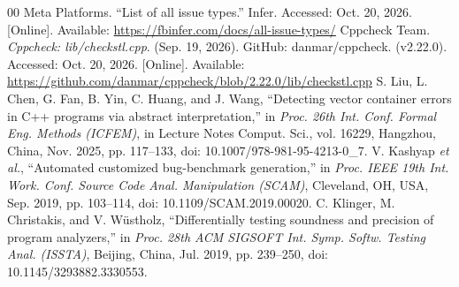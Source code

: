 \documentclass[conference]{IEEEtran}
\begin{document}
\begin{thebibliography}{00}
 Meta Platforms. ``List of all issue types.'' Infer. Accessed: Oct. 20, 2026. [Online]. Available: \url{https://fbinfer.com/docs/all-issue-types/}
 Cppcheck Team. \textit{Cppcheck: lib/checkstl.cpp}. (Sep. 19, 2026). GitHub: danmar/cppcheck. (v2.22.0). Accessed: Oct. 20, 2026. [Online]. Available: \url{https://github.com/danmar/cppcheck/blob/2.22.0/lib/checkstl.cpp}
 S. Liu, L. Chen, G. Fan, B. Yin, C. Huang, and J. Wang, ``Detecting vector container errors in C++ programs via abstract interpretation,'' in \textit{Proc. 26th Int. Conf. Formal Eng. Methods (ICFEM)}, in Lecture Notes Comput. Sci., vol. 16229, Hangzhou, China, Nov. 2025, pp. 117--133, doi: 10.1007/978-981-95-4213-0\_7.
 V. Kashyap \textit{et al.}, ``Automated customized bug-benchmark generation,'' in \textit{Proc. IEEE 19th Int. Work. Conf. Source Code Anal. Manipulation (SCAM)}, Cleveland, OH, USA, Sep. 2019, pp. 103--114, doi: 10.1109/SCAM.2019.00020.
 C. Klinger, M. Christakis, and V. W\"{u}stholz, ``Differentially testing soundness and precision of program analyzers,'' in \textit{Proc. 28th ACM SIGSOFT Int. Symp. Softw. Testing Anal. (ISSTA)}, Beijing, China, Jul. 2019, pp. 239--250, doi: 10.1145/3293882.3330553.
\end{thebibliography}
\end{document}
